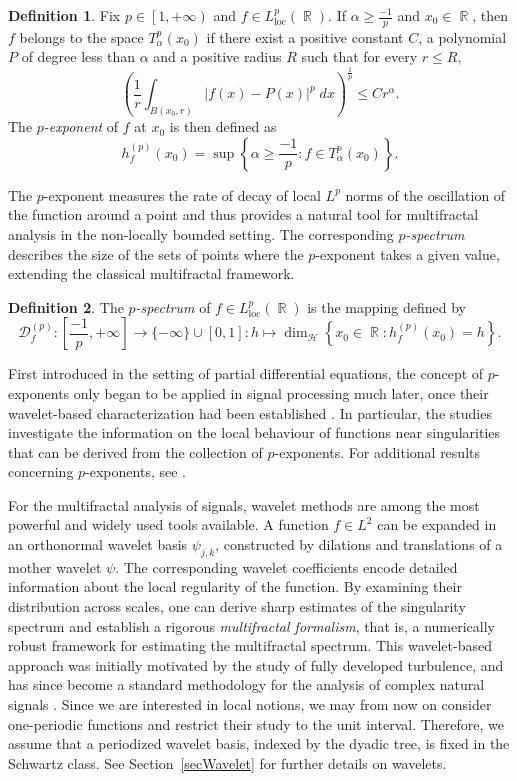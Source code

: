 \documentclass[a4paper,11pt,oneside]{article}
\DeclareMathOperator{\R}{\mathbb{R}}
\newcommand{\coint}[1]{\left[{#1}\right)}
\newcommand{\ccint}[1]{\left[{#1}\right]}
\newcommand{\modu}[1]{\left\vert{#1}\right\vert}
\theoremstyle{definition}
\newtheorem{defi}{Definition}[section]
\theoremstyle{plain}
\begin{document}
\begin{defi}
Fix $p\in\coint{1,+\infty}$ and $f\in L^p_{\text{loc}}(\R)$. If $\alpha\geq\frac{-1}{p}$ and $x_0\in\R$, then  $f$ belongs to the space $T^p_\alpha(x_0)$ if there exist a positive constant $C$, a polynomial $P$ of degree less than $\alpha$ and a positive radius $R$ such that for every $r\leq R$, 
\[
\left(\frac{1}{r}\int_{B(x_0,r)}\modu{f(x)-P(x)}^p\;dx\right)^{\frac{1}{p}}\leq Cr^\alpha.
\]
The \textit{$p$-exponent} of $f$ at $x_0$ is then defined as
\[
h_f^{(p)}(x_0)=\sup\left\{\alpha\geq\frac{-1}{p}:f\in T^p_\alpha(x_0)\right\}.
\]
\end{defi}

The $p$-exponent measures the rate of decay of local $L^p$ norms of the oscillation of the function around a point and thus provides a natural tool for multifractal analysis in the non-locally bounded setting. The corresponding \textit{$p$-spectrum} describes the size of the sets of points where the $p$-exponent takes a given value, extending the classical multifractal framework.

\begin{defi}
    The \emph{$p$-spectrum} of $f \in L^p_{\text{loc}}(\R)$ is the mapping defined by
\[
\mathscr{D}^{(p)}_f:\ccint{\frac{-1}{p},+\infty}\rightarrow\{-\infty\}\cup\ccint{0,1}:h\mapsto\dim_{\mathcal{H}}\left\{x_0\in\R:h^{(p)}_f(x_0)=h\right\}.
\]
\end{defi}

First introduced in the setting of partial differential equations, the concept of $p$-exponents only began to be applied in signal processing much later, once their wavelet-based characterization had been established \cite{jaffard_melot05}. In particular, the studies \cite{pexp1,pexp2} investigate the information on the local behaviour of functions near singularities that can be derived from the collection of $p$-exponents. For additional results concerning $p$-exponents, see \cite{MR3775457,MR3305158,MR3254609,MR2172009,MR3666574}.

For the multifractal analysis of  signals, wavelet methods are among the most powerful and widely used tools available. A function $f \in L^2$ can be expanded in an orthonormal wavelet basis $\psi_{j,k}$, constructed by dilations and translations of a mother wavelet $\psi$. The corresponding wavelet coefficients encode detailed information about the local regularity of the function. By examining their distribution across scales, one can derive sharp estimates of the singularity spectrum and establish a rigorous \emph{multifractal formalism}, that is, a numerically robust framework for estimating the multifractal spectrum. This wavelet-based approach was initially motivated by the study of fully developed turbulence, and has since become a standard methodology for the analysis of complex natural signals \cite{Abry:14,Arneodo:02,Parisi:85}. Since we are interested in local notions, we may from now on consider one-periodic functions and restrict their study to the unit interval. Therefore, we assume that a periodized wavelet basis, indexed by the dyadic tree, is fixed in the Schwartz class. See Section~\ref{secWavelet} for further details on wavelets.
\end{document}
